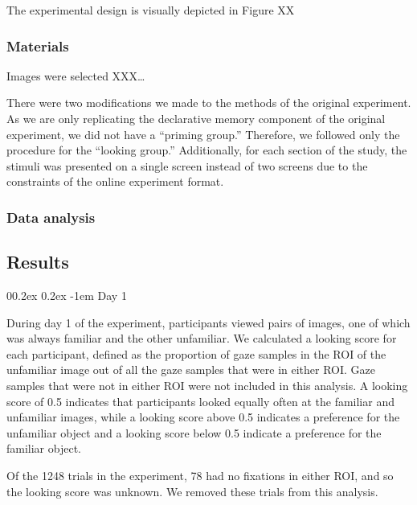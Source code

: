 \documentclass[
  man,floatsintext]{apa6}
\makeatletter
\let\oldparagraph\paragraph
\renewcommand{\paragraph}[1]{\oldparagraph{#1}\mbox{}}
\renewcommand{\paragraph}{\@startsection{paragraph}{4}{\parindent}%
  {0\baselineskip \@plus 0.2ex \@minus 0.2ex}%
  {-1em}%
  {\normalfont\normalsize\bfseries\itshape\typesectitle}}
\makeatother
\begin{document}
The experimental design is visually depicted in Figure XX

\hypertarget{materials}{%
\subsubsection{Materials}\label{materials}}

Images were selected XXX\ldots{}

There were two modifications we made to the methods of the original experiment. As we are only replicating the declarative memory component of the original experiment, we did not have a ``priming group.'' Therefore, we followed only the procedure for the ``looking group.'' Additionally, for each section of the study, the stimuli was presented on a single screen instead of two screens due to the constraints of the online experiment format.

\hypertarget{data-analysis-1}{%
\subsubsection{Data analysis}\label{data-analysis-1}}

\hypertarget{results-2}{%
\subsection{Results}\label{results-2}}

\hypertarget{day-1}{%
\paragraph{Day 1}\label{day-1}}

During day 1 of the experiment, participants viewed pairs of images, one of which was always familiar and the other unfamiliar. We calculated a looking score for each participant, defined as the proportion of gaze samples in the ROI of the unfamiliar image out of all the gaze samples that were in either ROI. Gaze samples that were not in either ROI were not included in this analysis. A looking score of 0.5 indicates that participants looked equally often at the familiar and unfamiliar images, while a looking score above 0.5 indicates a preference for the unfamiliar object and a looking score below 0.5 indicate a preference for the familiar object.

Of the 1248 trials in the experiment, 78 had no fixations in either ROI, and so the looking score was unknown. We removed these trials from this analysis.
\end{document}
